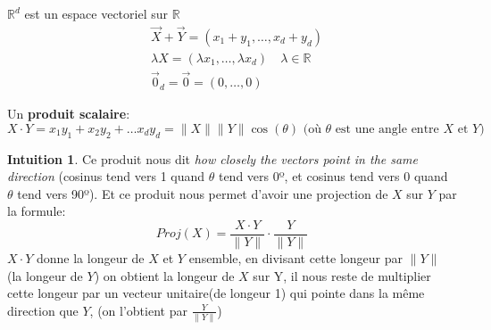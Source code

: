 \documentclass[a4paper]{report}
\newcommand\R{\ensuremath{\mathbb{R}}}
\theoremstyle{definition}
\newtheorem*{intuition}{Intuition}
\begin{document}
\begin{definition}
    $\R^d$ est un espace vectoriel sur  $\R$ 
    \begin{align*}
        &\vec{X} + \vec{Y} = (x_1 + y_1, \ldots, x_d + y_d)\\
        &\lambda X = (\lambda x_1, \ldots, \lambda x_d) \quad \lambda \in \R\\
        &\vec{0}_d = \vec{0} = (0, \ldots, 0)
    \end{align*}
\end{definition}
\begin{definition}\label{def:prod_scalaire}
    Un \textbf{produit scalaire}:
    \[
    X \cdot Y = x_1y_1 + x_2y_2 + \ldots x_dy_d = \|X\|\|Y\|\cos(\theta) \text{ (où } \theta \text{ est une angle entre } X \text{ et } Y \text{)}
    \] 
\end{definition}
\begin{intuition}
    Ce produit nous dit \textit{how closely the vectors point in the same direction} (cosinus tend vers 1 quand $\theta$ tend vers 0º, et cosinus tend vers 0 quand  $\theta$ tend vers 90º). Et ce produit nous permet d'avoir une projection de $X$ sur $Y$ par la formule:
    \[
    Proj(X) = \frac{X \cdot Y}{\|Y\|} \cdot \frac{Y}{\|Y\|}
    \] 
    $X \cdot Y$ donne la longeur de  $X$ et  $Y$ ensemble, en divisant cette longeur par  $\|Y\|$ (la longeur de $Y$) on obtient la longeur de $X$ sur Y, il nous reste de multiplier cette longeur par un vecteur unitaire(de longeur 1) qui pointe dans la même direction que  $Y$, (on l'obtient par $\frac{Y}{\|Y\|}$)
   \begin{center}
   \end{center}
\end{intuition}
\end{document}
